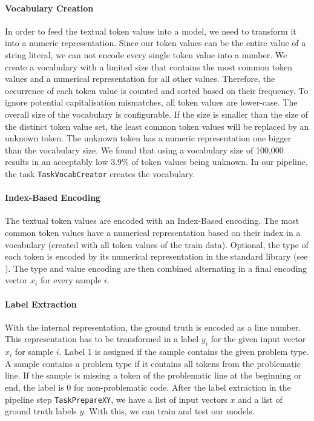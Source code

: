 \paragraph{Vocabulary Creation}
In order to feed the textual token values into a model, we need to transform it into a numeric representation. Since our token values can be the entire value of a string literal, we can not encode every single token value into a number. We create a vocabulary with a limited size that contains the most common token values and a numerical representation for all other values.
Therefore, the occurrence of each token value is counted and sorted based on their frequency. To ignore potential capitalisation mismatches, all token values are lower-case. The overall size of the vocabulary is configurable. If the size is smaller than the size of the distinct token value set, the least common token values will be replaced by an unknown token. The unknown token has a numeric representation one bigger than the vocabulary size. We found that using a vocabulary size of 100,000 results in an acceptably low 3.9\% of token values being unknown. In our pipeline, the task \texttt{TaskVocabCreator} creates the vocabulary.
\paragraph{Index-Based Encoding}
The textual token values are encoded with an Index-Based encoding. The most common token values have a numerical representation based on their index in a vocabulary (created with all token values of the train data). Optional, the type of each token is encoded by its numerical representation in the standard library (see ). The type and value encoding are then combined alternating in a final encoding vector $x_i$ for every sample $i$.
\paragraph{Label Extraction}
With the internal representation, the ground truth is encoded as a line number. This representation has to be transformed in a label $y_i$ for the given input vector $x_i$ for sample $i$. Label 1 is assigned if the sample contains the given problem type. A sample contains a problem type if it contains all tokens from the problematic line. If the sample is missing a token of the problematic line at the beginning or end, the label is 0 for non-problematic code.
After the label extraction in the pipeline step \texttt{TaskPrepareXY}, we have a list of input vectors $x$ and a list of ground truth labels $y$. With this, we can train and test our models.

